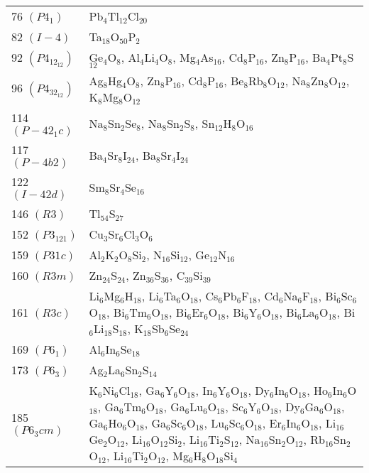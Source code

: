 {\begin{longtable}{p{7.315em}|p{40em}}
    76 $(P4_1)$ & Pb$_{4}$Tl$_{12}$Cl$_{20}$ \\
    82 $(I-4)$ & Ta$_{18}$O$_{50}$P$_{2}$ \\
    92 $(P4_12_12)$ & Ge$_{4}$O$_{8}$, Al$_{4}$Li$_{4}$O$_{8}$, Mg$_{4}$As$_{16}$, Cd$_{8}$P$_{16}$, Zn$_{8}$P$_{16}$, Ba$_{4}$Pt$_{8}$S$_{12}$ \\
    96 $(P4_32_12)$ & Ag$_{8}$Hg$_{4}$O$_{8}$, Zn$_{8}$P$_{16}$, Cd$_{8}$P$_{16}$, Be$_{8}$Rb$_{8}$O$_{12}$, Na$_{8}$Zn$_{8}$O$_{12}$, K$_{8}$Mg$_{8}$O$_{12}$ \\
    114 $(P-42_1c)$ & Na$_{8}$Sn$_{2}$Se$_{8}$, Na$_{8}$Sn$_{2}$S$_{8}$, Sn$_{12}$H$_{8}$O$_{16}$ \\
    117 $(P-4b2)$ & Ba$_{4}$Sr$_{8}$I$_{24}$, Ba$_{8}$Sr$_{4}$I$_{24}$ \\
    122 $(I-42d)$ & Sm$_{8}$Sr$_{4}$Se$_{16}$ \\
    146 $(R3)$ & Tl$_{54}$S$_{27}$ \\
    152 $(P3_121)$ & Cu$_{3}$Sr$_{6}$Cl$_{3}$O$_{6}$ \\
    159 $(P31c)$ & Al$_{2}$K$_{2}$O$_{8}$Si$_{2}$, N$_{16}$Si$_{12}$, Ge$_{12}$N$_{16}$ \\
    160 $(R3m)$ & Zn$_{24}$S$_{24}$, Zn$_{36}$S$_{36}$, C$_{39}$Si$_{39}$ \\
    161 $(R3c)$ & Li$_{6}$Mg$_{6}$H$_{18}$, Li$_{6}$Ta$_{6}$O$_{18}$, Cs$_{6}$Pb$_{6}$F$_{18}$, Cd$_{6}$Na$_{6}$F$_{18}$, Bi$_{6}$Sc$_{6}$O$_{18}$, Bi$_{6}$Tm$_{6}$O$_{18}$, Bi$_{6}$Er$_{6}$O$_{18}$, Bi$_{6}$Y$_{6}$O$_{18}$, Bi$_{6}$La$_{6}$O$_{18}$, Bi$_{6}$Li$_{18}$S$_{18}$, K$_{18}$Sb$_{6}$Se$_{24}$ \\
    169 $(P6_1)$ & Al$_{6}$In$_{6}$Se$_{18}$ \\
    173 $(P6_3)$ & Ag$_{2}$La$_{6}$Sn$_{2}$S$_{14}$ \\
    185 $(P6_3cm)$ & K$_{6}$Ni$_{6}$Cl$_{18}$, Ga$_{6}$Y$_{6}$O$_{18}$, In$_{6}$Y$_{6}$O$_{18}$, Dy$_{6}$In$_{6}$O$_{18}$, Ho$_{6}$In$_{6}$O$_{18}$, Ga$_{6}$Tm$_{6}$O$_{18}$, Ga$_{6}$Lu$_{6}$O$_{18}$, Sc$_{6}$Y$_{6}$O$_{18}$, Dy$_{6}$Ga$_{6}$O$_{18}$, Ga$_{6}$Ho$_{6}$O$_{18}$, Ga$_{6}$Sc$_{6}$O$_{18}$, Lu$_{6}$Sc$_{6}$O$_{18}$, Er$_{6}$In$_{6}$O$_{18}$, Li$_{16}$Ge$_{2}$O$_{12}$, Li$_{16}$O$_{12}$Si$_{2}$, Li$_{16}$Ti$_{2}$S$_{12}$, Na$_{16}$Sn$_{2}$O$_{12}$, Rb$_{16}$Sn$_{2}$O$_{12}$, Li$_{16}$Ti$_{2}$O$_{12}$, Mg$_{6}$H$_{8}$O$_{18}$Si$_{4}$ \\

\end{longtable}}
